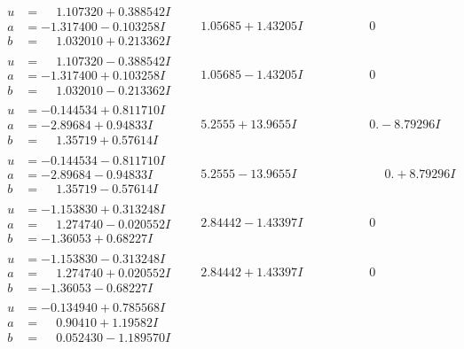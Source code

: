 \documentclass[1p]{elsarticle_modified}
\theoremstyle{definition}
\begin{document}
$$\begin{array}{c|c|c}
\begin{aligned}
u &= \phantom{-}1.107320 + 0.388542 I \\
a &= -1.317400 - 0.103258 I \\
b &= \phantom{-}1.032010 + 0.213362 I\end{aligned}
 & \phantom{-}1.05685 + 1.43205 I & \phantom{-0.000000 } 0 \\ \hline\begin{aligned}
u &= \phantom{-}1.107320 - 0.388542 I \\
a &= -1.317400 + 0.103258 I \\
b &= \phantom{-}1.032010 - 0.213362 I\end{aligned}
 & \phantom{-}1.05685 - 1.43205 I & \phantom{-0.000000 } 0 \\ \hline\begin{aligned}
u &= -0.144534 + 0.811710 I \\
a &= -2.89684 + 0.94833 I \\
b &= \phantom{-}1.35719 + 0.57614 I\end{aligned}
 & \phantom{-}5.2555 + 13.9655 I & \phantom{-0.000000 } 0. - 8.79296 I \\ \hline\begin{aligned}
u &= -0.144534 - 0.811710 I \\
a &= -2.89684 - 0.94833 I \\
b &= \phantom{-}1.35719 - 0.57614 I\end{aligned}
 & \phantom{-}5.2555 - 13.9655 I & \phantom{-0.000000 -}0. + 8.79296 I \\ \hline\begin{aligned}
u &= -1.153830 + 0.313248 I \\
a &= \phantom{-}1.274740 - 0.020552 I \\
b &= -1.36053 + 0.68227 I\end{aligned}
 & \phantom{-}2.84442 - 1.43397 I & \phantom{-0.000000 } 0 \\ \hline\begin{aligned}
u &= -1.153830 - 0.313248 I \\
a &= \phantom{-}1.274740 + 0.020552 I \\
b &= -1.36053 - 0.68227 I\end{aligned}
 & \phantom{-}2.84442 + 1.43397 I & \phantom{-0.000000 } 0 \\ \hline\begin{aligned}
u &= -0.134940 + 0.785568 I \\
a &= \phantom{-}0.90410 + 1.19582 I \\
b &= \phantom{-}0.052430 - 1.189570 I\end{aligned}

\end{array}$$
\end{document}
